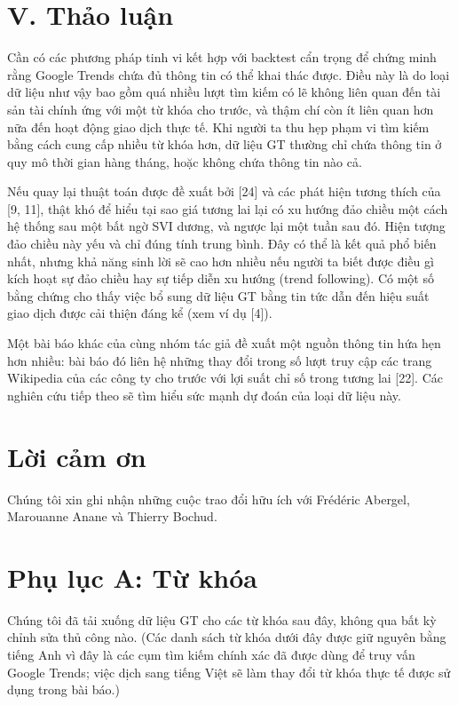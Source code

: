 \section{V. Thảo luận}

Cần có các phương pháp tinh vi kết hợp với backtest cẩn trọng để chứng minh rằng Google Trends chứa đủ thông tin có thể khai thác được. Điều này là do loại dữ liệu như vậy bao gồm quá nhiều lượt tìm kiếm có lẽ không liên quan đến tài sản tài chính ứng với một từ khóa cho trước, và thậm chí còn ít liên quan hơn nữa đến hoạt động giao dịch thực tế. Khi người ta thu hẹp phạm vi tìm kiếm bằng cách cung cấp nhiều từ khóa hơn, dữ liệu GT thường chỉ chứa thông tin ở quy mô thời gian hàng tháng, hoặc không chứa thông tin nào cả.

Nếu quay lại thuật toán được đề xuất bởi [24] và các phát hiện tương thích của [9, 11], thật khó để hiểu tại sao giá tương lai lại có xu hướng đảo chiều một cách hệ thống sau một bất ngờ SVI dương, và ngược lại một tuần sau đó. Hiện tượng đảo chiều này yếu và chỉ đúng tính trung bình. Đây có thể là kết quả phổ biến nhất, nhưng khả năng sinh lời sẽ cao hơn nhiều nếu người ta biết được điều gì kích hoạt sự đảo chiều hay sự tiếp diễn xu hướng (trend following). Có một số bằng chứng cho thấy việc bổ sung dữ liệu GT bằng tin tức dẫn đến hiệu suất giao dịch được cải thiện đáng kể (xem ví dụ [4]).

Một bài báo khác của cùng nhóm tác giả đề xuất một nguồn thông tin hứa hẹn hơn nhiều: bài báo đó liên hệ những thay đổi trong số lượt truy cập các trang Wikipedia của các công ty cho trước với lợi suất chỉ số trong tương lai [22]. Các nghiên cứu tiếp theo sẽ tìm hiểu sức mạnh dự đoán của loại dữ liệu này.

\section*{Lời cảm ơn}

Chúng tôi xin ghi nhận những cuộc trao đổi hữu ích với Frédéric Abergel, Marouanne Anane và Thierry Bochud.


\section*{Phụ lục A: Từ khóa}

Chúng tôi đã tải xuống dữ liệu GT cho các từ khóa sau đây, không qua bất kỳ chỉnh sửa thủ công nào. (Các danh sách từ khóa dưới đây được giữ nguyên bằng tiếng Anh vì đây là các cụm tìm kiếm chính xác đã được dùng để truy vấn Google Trends; việc dịch sang tiếng Việt sẽ làm thay đổi từ khóa thực tế được sử dụng trong bài báo.)

